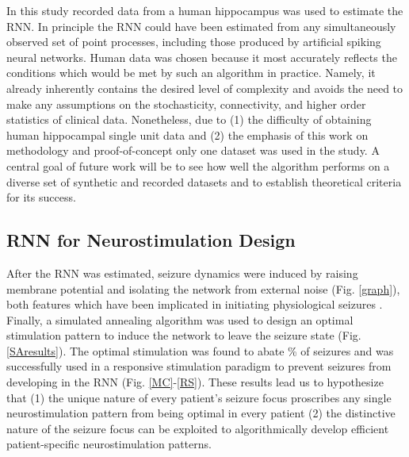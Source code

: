 \documentclass[11pt,a4paper,final]{article}
\begin{document}
In this study recorded data from a human hippocampus was used to estimate the RNN. 
In principle the RNN could have been estimated from any simultaneously observed set of point processes, including those produced by artificial spiking neural networks. 
Human data was chosen because it most accurately reflects the conditions which would be met by such an algorithm in practice. 
Namely, it already inherently contains the desired level of complexity and avoids the need to make any assumptions on the stochasticity, connectivity, and higher order statistics of clinical data.
Nonetheless, due to (1) the difficulty of obtaining human hippocampal single unit data and (2) the emphasis of this work on methodology and proof-of-concept only one dataset was used in the study. 
A central goal of future work will be to see how well the algorithm performs on a diverse set of synthetic and recorded datasets and to establish theoretical criteria for its success. 

\subsection{RNN for Neurostimulation Design}

After the RNN was estimated, seizure dynamics were induced by raising membrane potential and isolating the network from external noise (Fig. \ref{graph}), both features which have been implicated in initiating physiological seizures \citep{fricker99,wendling03,warren10}.
Finally, a simulated annealing algorithm was used to design an optimal stimulation pattern to induce the network to leave the seizure state (Fig. \ref{SAresults}).
The optimal stimulation was found to abate \success{}\% of seizures and was  successfully used in a responsive stimulation paradigm to prevent seizures from developing in the RNN (Fig. \ref{MC}-\ref{RS}).
These results lead us to hypothesize that (1) the unique nature of every patient's seizure focus proscribes any single neurostimulation pattern from being optimal in every patient (2) the distinctive nature of the seizure focus can be exploited to algorithmically develop efficient patient-specific neurostimulation patterns.
\end{document}
